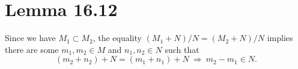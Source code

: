 
\section{Lemma 16.12}

Since we have $M_1\subset M_2$, the equality $(M_1+N)/N=(M_2+N)/N$ implies there are some $m_1,m_2\in M$ and $n_1,n_2\in N$ such that 
\[(m_2+n_2)+N=(m_1+n_1)+N ~\Rightarrow~ m_2-m_1\in N.\]